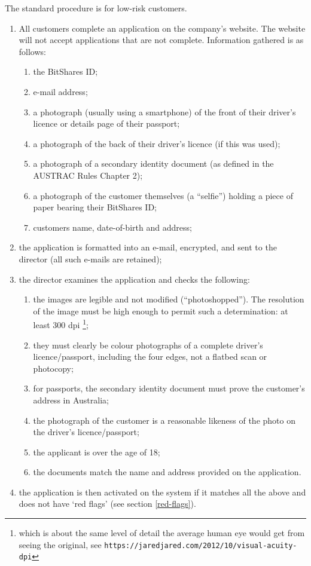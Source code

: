 \documentclass[12pt]{report}
\begin{document}
The standard procedure is for low-risk customers.
\begin{enumerate}
\item All customers complete an application on the company's website. The website will not
  accept applications that are not complete. Information gathered is as follows:
  \begin{enumerate}
  \item the BitShares ID;
  \item e-mail address;
  \item a photograph (usually using a smartphone) of the front of their driver's licence or details page of their passport;
  \item a photograph of the back of their driver's licence (if this was used);
  \item a photograph of a secondary identity document (as defined in the AUSTRAC Rules Chapter 2);
  \item a photograph of the customer themselves (a ``selfie'') holding a piece of paper bearing their BitShares ID;
  \item customers name, date-of-birth and address;
  \end{enumerate}
  \item the application is formatted into an e-mail, encrypted, and sent to the director (all such e-mails are retained);
  \item the director examines the application and checks the following:
    \begin{enumerate}
    \item the images are legible and not modified (``photoshopped''). The resolution of the image must be
      high enough to permit such a determination: at least 300 dpi \footnote{which is about the
        same level of detail the average human eye would get from seeing the original, see
      \texttt{https://jaredjared.com/2012/10/visual-acuity-dpi}};
    \item they must clearly be colour photographs of a complete driver's licence/passport, including the four edges, not a
      flatbed scan or photocopy;
    \item for passports, the secondary identity document must prove the customer's address in Australia;
    \item the photograph of the customer is a reasonable likeness of the photo on the driver's licence/passport;
    \item the applicant is over the age of 18;
    \item the documents match the name and address provided on the application.
    \end{enumerate}
  \item the application is then activated on the system if it matches all the above and does not have `red flags' (see section \ref{red-flags}).
\end{enumerate}
\end{document}
